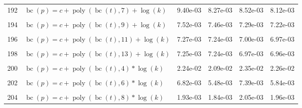 \documentclass[12pt,a4paper]{article}
\DeclareMathOperator{\bc}{bc}
\DeclareMathOperator{\poly}{poly}
\begin{document}
\begin{longtable}[t]{ll>{\raggedleft\arraybackslash}p{2cm}>{\raggedleft\arraybackslash}p{2cm}>{\raggedleft\arraybackslash}p{2cm}>{\raggedleft\arraybackslash}p{2cm}}
192 & $\bc(p) = c + \poly\left( \bc(t), 7 \right) + \log(k)$ & 9.40e-03 & 8.27e-03 & 8.52e-03 & 8.12e-03\\
\cellcolor{gray!6}{193} & \cellcolor{gray!6}{$\bc(p) = c + \poly\left( \bc(t), 8 \right) + \log(k)$} & \cellcolor{gray!6}{7.44e-03} & \cellcolor{gray!6}{7.41e-03} & \cellcolor{gray!6}{7.19e-03} & \cellcolor{gray!6}{7.15e-03}\\
194 & $\bc(p) = c + \poly\left( \bc(t), 9 \right) + \log(k)$ & 7.52e-03 & 7.46e-03 & 7.29e-03 & 7.22e-03\\
\cellcolor{gray!6}{195} & \cellcolor{gray!6}{$\bc(p) = c + \poly\left( \bc(t), 10 \right) + \log(k)$} & \cellcolor{gray!6}{7.26e-03} & \cellcolor{gray!6}{7.24e-03} & \cellcolor{gray!6}{6.99e-03} & \cellcolor{gray!6}{6.96e-03}\\
196 & $\bc(p) = c + \poly\left( \bc(t), 11 \right) + \log(k)$ & 7.27e-03 & 7.24e-03 & 7.00e-03 & 6.97e-03\\
\cellcolor{gray!6}{197} & \cellcolor{gray!6}{$\bc(p) = c + \poly\left( \bc(t), 12 \right) + \log(k)$} & \cellcolor{gray!6}{7.25e-03} & \cellcolor{gray!6}{7.24e-03} & \cellcolor{gray!6}{6.97e-03} & \cellcolor{gray!6}{6.96e-03}\\
198 & $\bc(p) = c + \poly\left( \bc(t), 13 \right) + \log(k)$ & 7.25e-03 & 7.24e-03 & 6.97e-03 & 6.96e-03\\
\cellcolor{gray!6}{199} & \cellcolor{gray!6}{$\bc(p) = c + \poly\left( \bc(t), 3 \right) * \log(k)$} & \cellcolor{gray!6}{5.47e-02} & \cellcolor{gray!6}{1.72e-02} & \cellcolor{gray!6}{1.91e-02} & \cellcolor{gray!6}{1.79e-02}\\
200 & $\bc(p) = c + \poly\left( \bc(t), 4 \right) * \log(k)$ & 2.24e-02 & 2.09e-02 & 2.35e-02 & 2.26e-02\\
\cellcolor{gray!6}{201} & \cellcolor{gray!6}{$\bc(p) = c + \poly\left( \bc(t), 5 \right) * \log(k)$} & \cellcolor{gray!6}{9.06e-03} & \cellcolor{gray!6}{9.04e-03} & \cellcolor{gray!6}{8.66e-03} & \cellcolor{gray!6}{8.66e-03}\\
202 & $\bc(p) = c + \poly\left( \bc(t), 6 \right) * \log(k)$ & 6.82e-03 & 5.48e-03 & 7.39e-03 & 5.84e-03\\
\cellcolor{gray!6}{203} & \cellcolor{gray!6}{$\bc(p) = c + \poly\left( \bc(t), 7 \right) * \log(k)$} & \cellcolor{gray!6}{6.04e-03} & \cellcolor{gray!6}{3.78e-03} & \cellcolor{gray!6}{4.62e-03} & \cellcolor{gray!6}{3.99e-03}\\
204 & $\bc(p) = c + \poly\left( \bc(t), 8 \right) * \log(k)$ & 1.93e-03 & 1.84e-03 & 2.05e-03 & 1.96e-03\\

\end{longtable}
\end{document}
